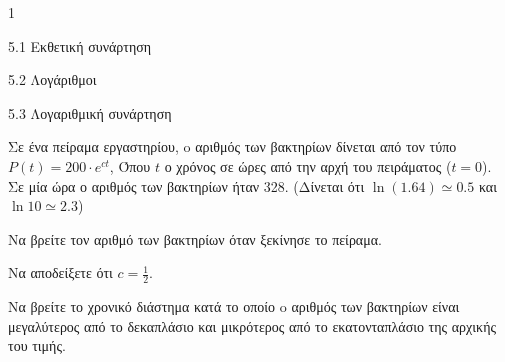 \begin{ylh}{1}
\item 5.1 Εκθετική συνάρτηση
\item 5.2 Λογάριθμοι
\item 5.3 Λογαριθμική συνάρτηση
\end{ylh}
Σε ένα πείραμα εργαστηρίου, o αριθμός των βακτηρίων δίνεται από τον τύπο
$P(t) = 200 \cdot e^{ct}$,
Όπου $t$ ο χρόνος σε ώρες από την αρχή του πειράματος ($t=0$). Σε μία ώρα ο αριθμός των βακτηρίων ήταν 328.
(Δίνεται ότι $\ln(1.64) \simeq 0.5$ και $\ln 10 \simeq 2.3$)
\begin{alist}
\item Να βρείτε τον αριθμό των βακτηρίων όταν ξεκίνησε το πείραμα.
\item Να αποδείξετε ότι $c = \frac{1}{2}$.
\item Να βρείτε το χρονικό διάστημα κατά το οποίο o αριθμός των βακτηρίων είναι μεγαλύτερος από το δεκαπλάσιο και μικρότερος από το εκατονταπλάσιο της αρχικής του τιμής.
\end{alist}

